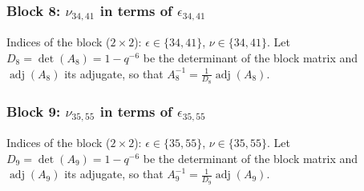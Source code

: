 \subsubsection{Block 8: $\nu_{34, 41}$ in terms of $\epsilon_{34, 41}$}
Indices of the block ($2\times 2$): $\epsilon \in \{34, 41\}$, $\nu \in \{34, 41\}$.
Let $D_{8} = \det(A_{8}) = 1-q^{-6}$ be the determinant of the block matrix and $\operatorname{adj}(A_{8})$ its adjugate, so that $A_{8}^{-1} = \frac{1}{D_{8}}\operatorname{adj}(A_{8})$.
\begin{center}
\end{center}

\subsubsection{Block 9: $\nu_{35, 55}$ in terms of $\epsilon_{35, 55}$}
Indices of the block ($2\times 2$): $\epsilon \in \{35, 55\}$, $\nu \in \{35, 55\}$.
Let $D_{9} = \det(A_{9}) = 1-q^{-6}$ be the determinant of the block matrix and $\operatorname{adj}(A_{9})$ its adjugate, so that $A_{9}^{-1} = \frac{1}{D_{9}}\operatorname{adj}(A_{9})$.
\begin{center}
\end{center}


